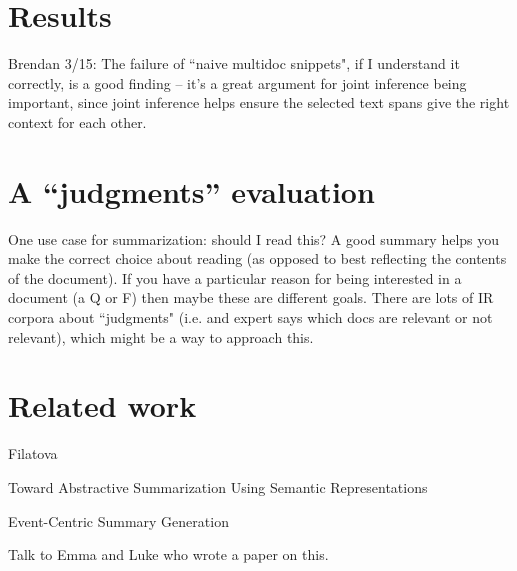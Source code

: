 \documentclass[11pt]{article}
\begin{document}
\section{Results}

Brendan 3/15: The failure of ``naive multidoc snippets", if I understand it correctly, is a good finding -- it's a great argument for joint inference being important, since joint inference helps ensure the selected text spans give the right context for each other.

\section{A ``judgments'' evaluation}
One use case for summarization: should I read this? A good summary helps you make the correct choice about reading (as opposed to best reflecting the contents of the document). If you have a particular reason for being interested in a document (a Q or F) then maybe these are different goals. There are lots of IR corpora about ``judgments" (i.e. and expert says which docs are relevant or not relevant), which might be a way to approach this.

\section{Related work}

Filatova

Toward Abstractive Summarization Using Semantic Representations

Event-Centric Summary Generation 

Talk to Emma and Luke who wrote a paper on this.

\printbibliography
\end{document}
